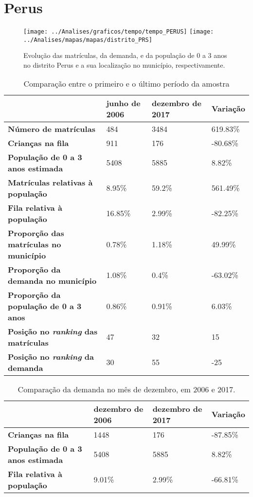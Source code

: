 \section{Perus}
\begin{figure}[H]
	\centering
	\texttt{[image: ../Analises/graficos/tempo/tempo\_PERUS]}
	\texttt{[image: ../Analises/mapas/mapas/distrito\_PRS]}
	\caption{Evolução das matrículas, da demanda, e da população de 0 a 3 anos no distrito Perus e a sua localização no município, respectivamente.}
\end{figure}
\begin{table}[H]
	\begin{tabular}{|l|l|l|l|}
		\hline
		\textbf{}                                      & \textbf{junho de 2006}       & \textbf{dezembro de 2017}    & \textbf{Variação} \\ \hline
		\textbf{Número de matrículas}                  & 484 & 3484 & 619.83\% \\ \hline
		\textbf{Crianças na fila}                      & 911 & 176 & -80.68\% \\ \hline
		\textbf{População de 0 a 3 anos estimada}      & 5408 & 5885 & 8.82\% \\ \hline
		\textbf{Matrículas relativas à população}      & 8.95\% & 59.2\% & 561.49\% \\ \hline
		\textbf{Fila relativa à população}             & 16.85\% & 2.99\% & -82.25\% \\ \hline
		\textbf{Proporção das matrículas no município} & 0.78\% & 1.18\% & 49.99\% \\ \hline
		\textbf{Proporção da demanda no município}     & 1.08\% & 0.4\% & -63.02\% \\ \hline
		\textbf{Proporção da população de 0 a 3 anos}  & 0.86\% & 0.91\% & 6.03\% \\ \hline
		\textbf{Posição no \textit{ranking} das matrículas}     & 47 & 32 & 15 \\ \hline
		\textbf{Posição no \textit{ranking} da demanda}         & 30 & 55 & -25 \\ \hline
	\end{tabular}
	\caption{Comparação entre o primeiro e o último período da amostra}
\end{table}
\begin{table}[H]
	\begin{tabular}{|l|l|l|l|}
		\hline
		\textbf{}                                 & \textbf{dezembro de 2006} & \textbf{dezembro de 2017} & \textbf{Variação} \\ \hline
		\textbf{Crianças na fila}                      & 1448 & 176 & -87.85\% \\ \hline
		\textbf{População de 0 a 3 anos estimada}      & 5408 & 5885 & 8.82\% \\ \hline
		\textbf{Fila relativa à população}             & 9.01\% & 2.99\% & -66.81\% \\ \hline
	\end{tabular}
	\caption{Comparação da demanda no mês de dezembro, em 2006 e 2017.}
\end{table}
